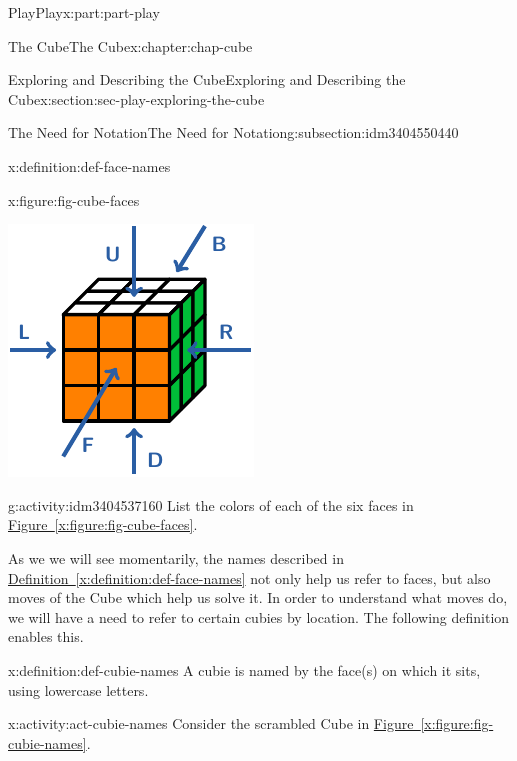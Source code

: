 \documentclass[oneside,10pt,]{book}
\newcommand{\xreffont}{\relax}
\numberwithin{equation}{section}
\begin{document}
\begin{partptx}{Play}{}{Play}{}{}{x:part:part-play}
\begin{chapterptx}{The Cube}{}{The Cube}{}{}{x:chapter:chap-cube}
\begin{sectionptx}{Exploring and Describing the Cube}{}{Exploring and Describing the Cube}{}{}{x:section:sec-play-exploring-the-cube}
\begin{subsectionptx}{The Need for Notation}{}{The Need for Notation}{}{}{g:subsection:idm3404550440}
\begin{definition}{}{x:definition:def-face-names}
\begin{figureptx}{}{x:figure:fig-cube-faces}{}
\begin{image}{0.25}{0.5}{0.25}
\includegraphics[width=\linewidth]{./images/faces.pdf}
\end{image}%
\tcblower
\end{figureptx}%
\end{definition}
\begin{activity}{}{g:activity:idm3404537160}%
List the colors of each of the six faces in \hyperref[x:figure:fig-cube-faces]{Figure~{\xreffont\ref{x:figure:fig-cube-faces}}}.%
\end{activity}%
As we we will see momentarily, the names described in \hyperref[x:definition:def-face-names]{Definition~{\xreffont\ref{x:definition:def-face-names}}} not only help us refer to faces, but also moves of the Cube which help us solve it. In order to understand what moves do, we will have a need to refer to certain cubies by location. The following definition enables this.%
\begin{definition}{}{x:definition:def-cubie-names}%
A cubie is named by the face(s) on which it sits, using lowercase letters.%
\end{definition}
\begin{activity}{}{x:activity:act-cubie-names}%
Consider the scrambled Cube in \hyperref[x:figure:fig-cubie-names]{Figure~{\xreffont\ref{x:figure:fig-cubie-names}}}.%
%
\begin{enumerate}

\end{enumerate}
\end{activity}
\end{subsectionptx}
\end{sectionptx}
\end{chapterptx}
\end{partptx}
\end{document}
